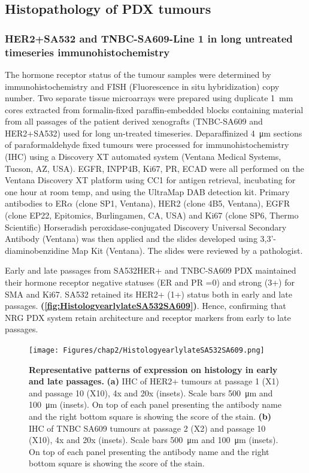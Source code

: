 \subsection{Histopathology of PDX tumours}

\subsubsection{HER2+SA532 and TNBC-SA609-Line 1 in long untreated timeseries immunohistochemistry}
The hormone receptor status of the tumour samples were determined by immunohistochemistry and FISH (Fluorescence in situ hybridization) copy number.
Two separate tissue microarrays were prepared using duplicate \SI{1}{\mm} cores extracted from formalin-fixed paraffin-embedded blocks containing material from all passages of the patient derived xenografts (TNBC-SA609 and HER2+SA532) used for long un-treated timeseries. 
Deparaffinized \SI{4}{\um} sections of paraformaldehyde fixed tumours were processed for immunohistochemistry (IHC) using a Discovery XT automated system (Ventana Medical Systems, Tucson, AZ, USA). 
EGFR, INPP4B, Ki67, PR, ECAD were all performed on the Ventana Discovery XT platform using CC1 for antigen retrieval, incubating for one hour at room temp, and using the UltraMap DAB detection kit.
Primary antibodies to ER$\alpha$ (clone SP1, Ventana), HER2 (clone 4B5, Ventana), EGFR (clone EP22, Epitomics, Burlingamen, CA, USA) and Ki67 (clone SP6, Thermo Scientific) 
Horseradish peroxidase-conjugated Discovery Universal Secondary Antibody (Ventana) was then applied and the slides developed using 3,3'-diaminobenzidine Map Kit (Ventana). 
The slides were reviewed by a pathologist. 

Early and late passages from SA532HER+ and TNBC-SA609 PDX  maintained their hormone receptor negative statuses (ER and PR =0) and strong (3+) for SMA and Ki67. SA532 retained its HER2+ (1+) status both in early and late passages.
\textbf{(\autoref{fig:HistologyearlylateSA532SA609})}. Hence, confirming that NRG PDX system retain architecture and receptor markers from early to late passages.

 \begin{figure}
\centering
\texttt{[image: Figures/chap2/HistologyearlylateSA532SA609.png]}
	
\caption[Representative patterns of expression on histology in early and late passages]
	{\small
\textbf{Representative patterns of expression on histology in early and late passages.}
 \textbf{(a)} IHC of HER2+ tumours at passage 1 (X1) and passage 10 (X10), 4x and 20x (insets). Scale bars \SI{500}{\micro\metre} and \SI{100}{\micro\metre} (insets). On top of each panel presenting the antibody name and the right bottom square is showing the score of the stain.
\textbf{(b)} IHC of TNBC SA609 tumours at passage 2 (X2) and passage 10 (X10), 4x and 20x (insets). Scale bars \SI{500}{\micro\metre} and \SI{100}{\micro\metre} (insets). On top of each panel presenting the antibody name and the right bottom square is showing the score of the stain.}
	\label{fig:HistologyearlylateSA532SA609}
\end{figure}


